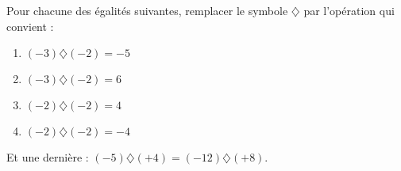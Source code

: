
\begin{exercice}\label{exosmath-0754}

    Pour chacune des égalités suivantes, remplacer le symbole \( \diamondsuit\) par l'opération qui convient :
    \begin{multicols}{2}
        \begin{enumerate}
            \item
                \( (-3)\diamondsuit (-2)=-5\)
            \item
                \( (-3)\diamondsuit(-2)=6\)
            \item
                \( (-2)\diamondsuit (-2)=4\)
            \item
                \( (-2)\diamondsuit (-2)=-4\)
        \end{enumerate}
    \end{multicols}
    Et une dernière : \( (-5)\diamondsuit (+4)=(-12)\diamondsuit (+8)\).

\end{exercice}
